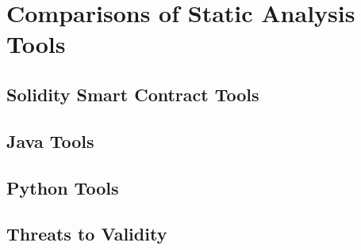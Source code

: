 \section{Comparisons of Static Analysis Tools}

\subsection{Solidity Smart Contract Tools}

\subsection{Java Tools}

\subsection{Python Tools}

\subsection{Threats to Validity}